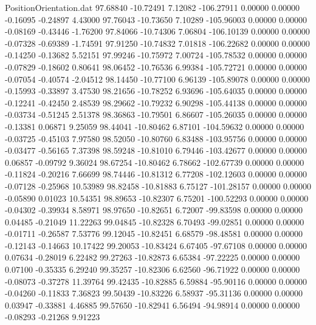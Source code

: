 \begin{filecontents}{PositionOrientation.dat}
  97.68840  -10.72491    7.12082  -106.27911    0.00000    0.00000   -0.16095   -0.24897    4.43000
  97.76043  -10.73650    7.10289  -105.96003    0.00000    0.00000   -0.08169   -0.43446   -1.76200
  97.84066  -10.74306    7.06804  -106.10139    0.00000    0.00000   -0.07328   -0.69389   -1.74591
  97.91250  -10.74832    7.01818  -106.22682    0.00000    0.00000   -0.14250   -0.13682    5.52151
  97.99246  -10.75972    7.00724  -105.78532    0.00000    0.00000   -0.07829   -0.18602    0.80641
  98.06452  -10.76536    6.99384  -105.72721    0.00000    0.00000   -0.07054   -0.40574   -2.04512
  98.14450  -10.77100    6.96139  -105.89078    0.00000    0.00000   -0.15993   -0.33897    3.47530
  98.21656  -10.78252    6.93696  -105.64035    0.00000    0.00000   -0.12241   -0.42450    2.48539
  98.29662  -10.79232    6.90298  -105.44138    0.00000    0.00000   -0.03734   -0.51245    2.51378
  98.36863  -10.79501    6.86607  -105.26035    0.00000    0.00000   -0.13381    0.06871    9.25059
  98.44041  -10.80462    6.87101  -104.59632    0.00000    0.00000   -0.03725   -0.45103    7.97580
  98.52050  -10.80760    6.83488  -103.95756    0.00000    0.00000   -0.03477   -0.56165    7.37398
  98.59248  -10.81010    6.79446  -103.42677    0.00000    0.00000    0.06857   -0.09792    9.36024
  98.67254  -10.80462    6.78662  -102.67739    0.00000    0.00000   -0.11824   -0.20216    7.66699
  98.74446  -10.81312    6.77208  -102.12603    0.00000    0.00000   -0.07128   -0.25968   10.53989
  98.82458  -10.81883    6.75127  -101.28157    0.00000    0.00000   -0.05890    0.01023   10.54351
  98.89653  -10.82307    6.75201  -100.52293    0.00000    0.00000   -0.04302   -0.39934    8.58971
  98.97650  -10.82651    6.72007   -99.83598    0.00000    0.00000    0.04485   -0.21049   11.22263
  99.04845  -10.82328    6.70493   -99.02851    0.00000    0.00000   -0.01711   -0.26587    7.53776
  99.12045  -10.82451    6.68579   -98.48581    0.00000    0.00000   -0.12143   -0.14663   10.17422
  99.20053  -10.83424    6.67405   -97.67108    0.00000    0.00000    0.07634   -0.28019    6.22482
  99.27263  -10.82873    6.65384   -97.22225    0.00000    0.00000    0.07100   -0.35335    6.29240
  99.35257  -10.82306    6.62560   -96.71922    0.00000    0.00000   -0.08073   -0.37278   11.39764
  99.42435  -10.82885    6.59884   -95.90116    0.00000    0.00000   -0.04260   -0.11833    7.36823
  99.50439  -10.83226    6.58937   -95.31136    0.00000    0.00000    0.03947   -0.33881    4.46885
  99.57650  -10.82941    6.56494   -94.98914    0.00000    0.00000   -0.08293   -0.21268    9.91223

\end{filecontents}
